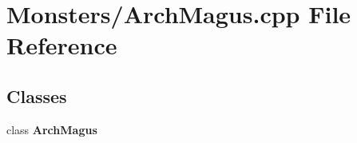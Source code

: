 \section{Monsters/\-Arch\-Magus.cpp File Reference}
\label{_arch_magus_8cpp}
\subsection*{Classes}
\begin{DoxyCompactItemize}
\item 
class {\bf Arch\-Magus}
\end{DoxyCompactItemize}
